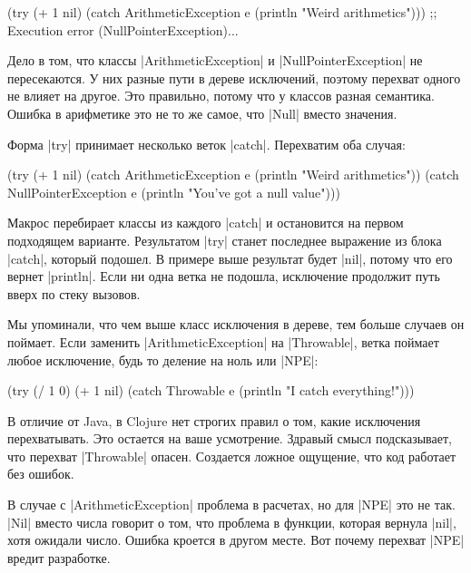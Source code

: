 \begin{english}
  \begin{clojure}
(try
  (+ 1 nil)
  (catch ArithmeticException e
    (println "Weird arithmetics")))
;; Execution error (NullPointerException)...
  \end{clojure}
\end{english}

Дело в том, что классы \spverb|ArithmeticException| и
\spverb|NullPointerException| не пересекаются. У них разные пути в дереве
исключений, поэтому перехват одного не влияет на другое. Это правильно, потому
что у классов разная семантика. Ошибка в арифметике это не то же самое, что
\spverb|Null| вместо значения.

Форма \spverb|try| принимает несколько веток \spverb|catch|. Перехватим оба
случая:

\begin{english}
  \begin{clojure}
(try
  (+ 1 nil)
  (catch ArithmeticException e
    (println "Weird arithmetics"))
  (catch NullPointerException e
    (println "You've got a null value")))
  \end{clojure}
\end{english}

Макрос перебирает классы из каждого \spverb|catch| и остановится на первом
подходящем варианте. Результатом \spverb|try| станет последнее выражение из
блока \spverb|catch|, который подошел. В примере выше результат будет
\spverb|nil|, потому что его вернет \spverb|println|. Если ни одна ветка не
подошла, исключение продолжит путь вверх по стеку вызовов.

Мы упоминали, что чем выше класс исключения в дереве, тем больше случаев он
поймает. Если заменить \spverb|ArithmeticException| на \spverb|Throwable|, ветка
поймает любое исключение, будь то деление на ноль или \spverb|NPE|:

\begin{english}
  \begin{clojure}
(try
  (/ 1 0)
  (+ 1 nil)
  (catch Throwable e
    (println "I catch everything!")))
  \end{clojure}
\end{english}

В отличие от Java, в Clojure нет строгих правил о том, какие исключения
перехватывать. Это остается на ваше усмотрение. Здравый смысл подсказывает, что
перехват \spverb|Throwable| опасен. Создается ложное ощущение, что код работает
без ошибок.

В случае с \spverb|ArithmeticException| проблема в расчетах, но для \spverb|NPE|
это не так. \spverb|Nil| вместо числа говорит о том, что проблема в функции,
которая вернула \spverb|nil|, хотя ожидали число. Ошибка кроется в другом
месте. Вот почему перехват \spverb|NPE| вредит разработке.

